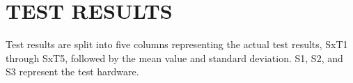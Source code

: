 \chapter{TEST RESULTS}
\label{app:test_results}

Test results are split into five columns representing the actual test results,
SxT1 through SxT5, followed by the mean value and standard deviation. S1, S2,
and S3 represent the test hardware.


